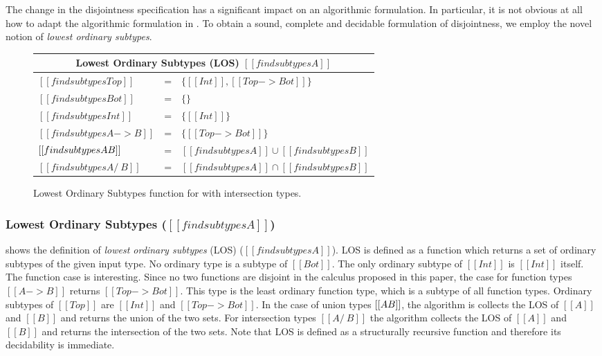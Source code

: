 The change in the disjointness specification has a significant impact on an
algorithmic formulation. In particular, it is not obvious at all how to adapt
the algorithmic formulation in . To obtain a
sound, complete and decidable formulation of disjointness, we employ the novel
notion of \emph{lowest ordinary subtypes}.

\begin{figure}[t]
    \centering
    {\renewcommand{\arraystretch}{1.2}
    \begin{tabular}{|lcl|}
      \multicolumn{3}{c}{Lowest Ordinary Subtypes (LOS) $[[findsubtypes A]]$} \\
      \hline
     $[[findsubtypes Top]]$ & = & $\{ [[Int]], [[Top -> Bot]]\}$  \\
     $[[findsubtypes Bot]]$ & = & $\{\}$  \\
     $[[findsubtypes Int]]$ & = & $\{ [[Int]] \}$  \\
     $[[findsubtypes A -> B]]$ & = & $\{ [[Top -> Bot]] \}$  \\
     $[[findsubtypes A \/ B]]$ & = & $ [[findsubtypes A]] \cup [[findsubtypes B]] $\\
     $[[findsubtypes A /\ B]]$ & = & $ [[findsubtypes A]] \cap [[findsubtypes B]] $\\
      \hline
    \end{tabular} }
  \caption{Lowest Ordinary Subtypes function for \cal with intersection types.}
  \label{fig:inter:los}
\end{figure}


\subsubsection*{Lowest Ordinary Subtypes ($[[findsubtypes A]]$)}
 shows the definition of
\emph{lowest ordinary subtypes} (LOS) ($[[findsubtypes A]]$).
LOS is defined as a function which
returns a set of ordinary subtypes of the given input type. 
No ordinary type is a subtype of $[[Bot]]$. The only ordinary
subtype of $[[Int]]$ is $[[Int]]$ itself. The function case is
interesting. Since no two functions are disjoint in the calculus
proposed in this paper, the case for function types $[[A -> B]]$ returns $[[Top
    -> Bot]]$. This type is the least ordinary function type, which is a subtype
of all function types.
Ordinary
subtypes of $[[Top]]$ are $[[Int]]$ and $[[Top -> Bot]]$.
In the case of union types $[[A \/ B]]$, the
algorithm is collects the LOS of $[[A]]$ and $[[B]]$ and returns the union of the
two sets. For intersection types $[[A
    /\ B]]$ the algorithm collects the LOS of $[[A]]$ and $[[B]]$
and returns the intersection of the two sets.
Note that LOS is defined as a structurally recursive function and therefore
its decidability is immediate.

